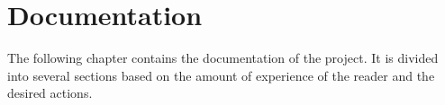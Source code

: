 \chapter{Documentation}
The following chapter contains the documentation of the project. 
It is divided into several sections based on the amount of experience of the reader and the desired actions.



